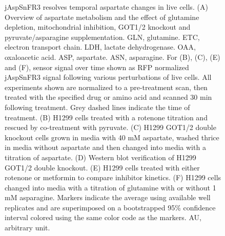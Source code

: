 \documentclass[9pt,lineno]{elife}
\begin{document}
\begin{figure}[ht!]
\ContinuedFloat
\caption{
jAspSnFR3 resolves temporal aspartate changes in live cells.
(A) Overview of aspartate metabolism and the effect of glutamine depletion, mitochondrial inhibition, GOT1/2 knockout and pyruvate/asparagine supplementation.
GLN, glutamine.
ETC, electron transport chain.
LDH, lactate dehydrogenase.
OAA, oxaloacetic acid.
ASP, aspartate.
ASN, asparagine.
For (B), (C), (E) and (F), sensor signal over time shown as RFP normalized jAspSnFR3 signal following various perturbations of live cells.
All experiments shown are normalized to a pre-treatment scan, then treated with the specified drug or amino acid and scanned 30 min following treatment.
Grey dashed lines indicate the time of treatment.
(B) H1299 cells treated with a rotenone titration and rescued by co-treatment with pyruvate.
(C) H1299 GOT1/2 double knockout cells grown in media with 40 mM aspartate, washed thrice in media without aspartate and then changed into media with a titration of aspartate.
(D) Western blot verification of H1299 GOT1/2 double knockout.
(E) H1299 cells treated with either rotenone or metformin to compare inhibitor kinetics.
(F) H1299 cells changed into media with a titration of glutamine with or without 1 mM asparagine.
Markers indicate the average using available well replicates and are superimposed on a bootstrapped 95\% confidence interval colored using the same color code as the markers.
AU, arbitrary unit.
}
\label{fig:Fig2}
\end{figure}
\end{document}
